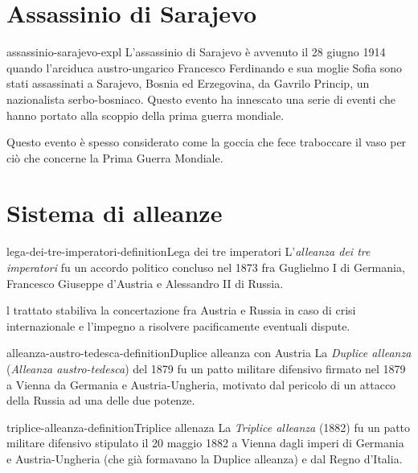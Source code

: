 \documentclass[preview]{standalone}
\begin{document}
\section{Assassinio di Sarajevo}

\begin{snippet}{assassinio-sarajevo-expl}
    L'assassinio di Sarajevo è avvenuto il 28 giugno 1914
    quando l'arciduca austro-ungarico Francesco Ferdinando e
    sua moglie Sofia sono stati assassinati a Sarajevo,
    Bosnia ed Erzegovina, da Gavrilo Princip,
    un nazionalista serbo-bosniaco.
    Questo evento ha innescato una serie di eventi che hanno portato alla
    scoppio della prima guerra mondiale.

    Questo evento è spesso considerato come la goccia che fece traboccare il vaso
    per ciò che concerne la Prima Guerra Mondiale.
\end{snippet}

\section{Sistema di alleanze}

\begin{snippetdefinition}{lega-dei-tre-imperatori-definition}{Lega dei tre imperatori}
    L'\textit{alleanza dei tre imperatori}
    fu un accordo politico concluso nel
    1873 fra Guglielmo I di Germania, Francesco Giuseppe d'Austria e Alessandro II di Russia.
\end{snippetdefinition}

\begin{plainhtml}
    l trattato stabiliva la concertazione fra Austria e Russia in caso
    di crisi internazionale e l'impegno a risolvere pacificamente eventuali dispute.
\end{plainhtml}

\begin{snippetdefinition}{alleanza-austro-tedesca-definition}{Duplice alleanza con Austria}
    La \textit{Duplice alleanza} (\textit{Alleanza austro-tedesca})
    del 1879 fu un patto militare difensivo firmato nel 1879 a Vienna da Germania
    e Austria-Ungheria, motivato dal pericolo di un attacco della Russia ad una delle due potenze.
\end{snippetdefinition}

\begin{snippetdefinition}{triplice-alleanza-definition}{Triplice allenaza}
    La \textit{Triplice alleanza} (1882)
    fu un patto militare difensivo stipulato il 20 maggio 1882 a
    Vienna dagli imperi di Germania e Austria-Ungheria
    (che già formavano la Duplice alleanza) e dal Regno d'Italia. 
\end{snippetdefinition}
\end{document}
